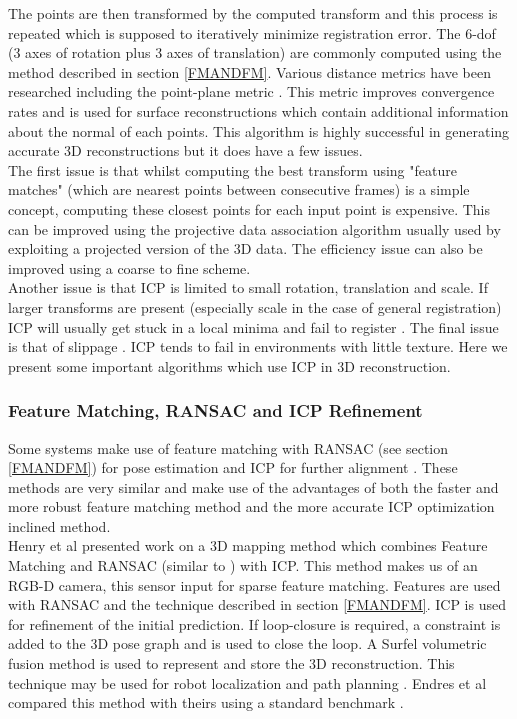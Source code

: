 The points are then transformed by the computed transform and this process is repeated which is supposed to iteratively minimize registration error. The 6-dof (3 axes of rotation plus 3 axes of translation) are commonly computed using the method described in section \ref{FMANDFM}. Various distance metrics have been researched including the point-plane metric \cite{Chen92Object}. This metric improves convergence rates and is used for surface reconstructions which contain additional information about the normal of each points. This algorithm is highly successful in generating accurate 3D reconstructions but it does have a few issues. \\

The first issue is that whilst computing the best transform using "feature matches" (which are nearest points between consecutive frames) is a simple concept, computing these closest points for each input point is expensive. This can be improved using the projective data association algorithm \cite{Blais95Registering} usually used by exploiting a projected version of the 3D data. The efficiency issue can also be improved using a coarse to fine scheme. \\

Another issue is that ICP is limited to small rotation, translation and scale. If larger transforms are present (especially scale in the case of general registration) ICP will usually get stuck in a local minima and fail to register \cite{Mitra04Registration}. The final issue is that of slippage \cite{Whelan13Robust}. ICP tends to fail in environments with little texture. Here we present some important algorithms which use ICP in 3D reconstruction.

\subsubsection{Feature Matching, RANSAC and ICP Refinement}

Some systems make use of feature matching with RANSAC (see section \ref{FMANDFM}) for pose estimation and ICP for further alignment \cite{Engelhard11Real, Henry10Rgb}. These methods are very similar and make use of the advantages of both the faster and more robust feature matching method and the more accurate ICP optimization inclined method. \\

Henry et al \cite{Henry10Rgb} presented work on a 3D mapping method which combines Feature Matching and RANSAC (similar to \cite{Endres12Evaluation}) with ICP. This method makes us of an RGB-D camera, this sensor input for sparse feature matching. Features are used with RANSAC and the technique described in section \ref{FMANDFM}. ICP is used for refinement of the initial prediction. If loop-closure is required, a constraint is added to the 3D pose graph \cite{Kummerle11G} and is used to close the loop. A Surfel \cite{Pfister00Surfels} volumetric fusion method is used to represent and store the 3D reconstruction. This technique may be used for robot localization and path planning \cite{Hornung10Humanoid}. Endres et al \cite{Endres12Evaluation} compared this method with theirs using a standard benchmark \cite{Sturm12Benchmark}.  \\

